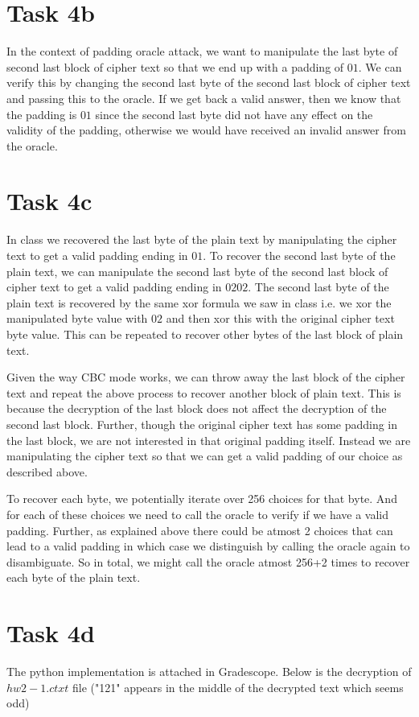 \documentclass{article}
\begin{document}
    \section*{Task 4b}
    In the context of padding oracle attack, we want to manipulate the last byte of second last block of cipher text so that we end up with a padding of $01$. We can verify this by changing the second last byte of the second last block of cipher text and passing this to the oracle. If we get back a valid answer, then we know that the padding is $01$ since the second last byte did not have any effect on the validity of the padding, otherwise we would have received an invalid answer from the oracle.

    \section*{Task 4c}
    In class we recovered the last byte of the plain text by manipulating the cipher text to get a valid padding ending in $01$. To recover the second last byte of the plain text, we can manipulate the second last byte of the second last block of cipher text to get a valid padding ending in $02 02$. The second last byte of the plain text is recovered by the same xor formula we saw in class i.e. we xor the manipulated byte value with $02$ and then xor this with the original cipher text byte value. This can be repeated to recover other bytes of the last block of plain text.

    Given the way CBC mode works, we can throw away the last block of the cipher text and repeat the above process to recover another block of plain text. This is because the decryption of the last block does not affect the decryption of the second last block. Further, though the original cipher text has some padding in the last block, we are not interested in that original padding itself. Instead we are manipulating the cipher text so that we can get a valid padding of our choice as described above.

    To recover each byte, we potentially iterate over 256 choices for that byte. And for each of these choices we need to call the oracle to verify if we have a valid padding. Further, as explained above there could be atmost 2 choices that can lead to a valid padding in which case we distinguish by calling the oracle again to disambiguate. So in total, we might call the oracle atmost 256+2 times to recover each byte of the plain text.

    \section*{Task 4d}
    The python implementation is attached in Gradescope. Below is the decryption of $hw2-1.ctxt$ file ("121" appears in the middle of the decrypted text which seems odd)
\end{document}
